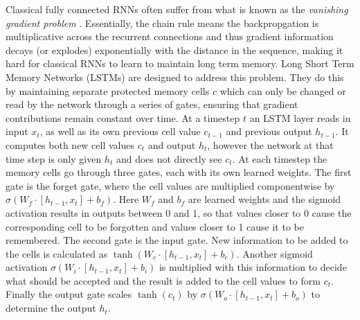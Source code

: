 \documentclass{article}
\numberwithin{figure}{section}
\theoremstyle{definition}
\begin{document}
Classical fully connected RNNs often suffer from what is known as the \textit{vanishing gradient problem} \citep{hochreiter1991untersuchungen}.
Essentially, the chain rule means the backpropgation is multiplicative across the recurrent connections and thus gradient information decays (or explodes) exponentially with the distance in the sequence, making it hard for classical RNNs to learn to maintain long term memory. 
Long Short Term Memory Networks (LSTMs) are designed to address this problem.
They do this by maintaining separate protected memory cells $c$ which can only be changed or read by the network through a series of gates, ensuring that gradient contributions remain constant over time.
At a timestep $t$ an LSTM layer reads in input $x_t$, as well as its own previous cell value $c_{t-1}$ and previous output $h_{t-1}$.
It computes both new cell values $c_t$ and output $h_t$, however the network at that time step is only given $h_t$ and does not directly see $c_t$.
At each timestep the memory cells go through three gates, each with its own learned weights.
The first gate is the forget gate, where the cell values are multiplied componentwise by $\sigma( W_f\cdot [h_{t-1},x_t]+b_f)$.
Here $W_f$ and $b_f$ are learned weights and the sigmoid activation results in outputs between 0 and 1, so that values closer to 0 cause the corresponding cell to be forgotten and values closer to 1 cause it to be remembered.
The second gate is the input gate.
New information to be added to the cells is calculated as $\tanh( W_c\cdot [h_{t-1},x_t]+b_c)$.
Another sigmoid activation $\sigma( W_i\cdot [h_{t-1},x_t]+b_i)$ is multiplied with this information to decide what should be accepted and the result is added to the cell values to form $c_t$.
Finally the output gate scales $\tanh(c_t)$ by $\sigma( W_o\cdot [h_{t-1},x_t]+b_o)$ to determine the output $h_t$.
\end{document}
